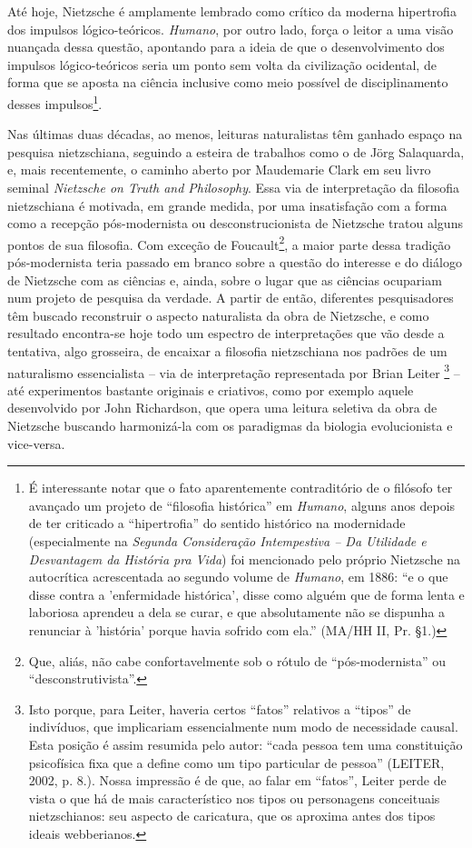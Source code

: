 \documentclass[
	12pt,				%
	openright,			%
	oneside,			%
	a4paper,			%
	english,			%
	french,				%
	spanish,			%
	brazil				%
	]{abntex2}
\newcommand{\Hum}{\textit{Humano}\xspace}
\begin{document}
	Até hoje, Nietzsche é amplamente lembrado como crítico da moderna hipertrofia dos impulsos lógico-teóricos. \Hum, por outro lado, força o leitor a uma visão nuançada dessa questão, apontando para a ideia de que o desenvolvimento dos impulsos lógico-teóricos seria um ponto sem volta da civilização ocidental, de forma que se aposta na ciência inclusive como meio possível de disciplinamento desses impulsos\footnote{É interessante notar que o fato aparentemente contraditório de o filósofo ter avançado um projeto de “filosofia histórica” em \textit{Humano}, alguns anos depois de ter criticado a “hipertrofia” do sentido histórico na modernidade (especialmente na \textit{Segunda Consideração Intempestiva – Da Utilidade e Desvantagem da História pra Vida}) foi mencionado pelo próprio Nietzsche na autocrítica acrescentada ao segundo volume de \textit{Humano}, em 1886: “e o que disse contra a 'enfermidade histórica', disse como alguém que de forma lenta e laboriosa aprendeu a dela se curar, e que absolutamente não se dispunha a renunciar à 'história' porque havia sofrido com ela.” (MA/HH II, Pr. §1.)}.

	Nas últimas duas décadas, ao menos, leituras naturalistas têm ganhado espaço na pesquisa nietzschiana, seguindo a esteira de trabalhos como o de Jörg Salaquarda, e, mais recentemente, o caminho aberto por Maudemarie Clark em seu livro seminal \textit{Nietzsche on Truth and Philosophy}. Essa via de interpretação da filosofia nietzschiana é motivada, em grande medida, por uma insatisfação com a forma como a recepção pós-modernista ou desconstrucionista de Nietzsche tratou alguns pontos de sua filosofia. Com exceção de Foucault\footnote{Que, aliás, não cabe confortavelmente sob o rótulo de “pós-modernista” ou “desconstrutivista”.}, a maior parte dessa tradição pós-modernista teria passado em branco sobre a questão do interesse e do diálogo de Nietzsche com as ciências e, ainda, sobre o lugar que as ciências ocupariam num projeto de pesquisa da verdade. A partir de então, diferentes pesquisadores têm buscado reconstruir o aspecto naturalista da obra de Nietzsche, e como resultado encontra-se hoje todo um espectro de interpretações que vão desde a tentativa, algo grosseira, de encaixar a filosofia nietzschiana nos padrões de um naturalismo essencialista – via de interpretação representada por Brian Leiter
\footnote{Isto porque, para Leiter, haveria certos “fatos” relativos a “tipos” de indivíduos, que implicariam essencialmente num modo de necessidade causal. Esta posição é assim resumida pelo autor: “cada pessoa tem uma constituição psicofísica fixa que a define como um tipo particular de pessoa” (LEITER, 2002, p. 8.). Nossa impressão é de que, ao falar em “fatos”, Leiter perde de vista o que há de mais característico nos tipos ou personagens conceituais nietzschianos: seu aspecto de caricatura, que os aproxima antes dos tipos ideais webberianos.} 
– até experimentos bastante originais e criativos, como por exemplo aquele desenvolvido por John Richardson, que opera uma  leitura seletiva da obra de Nietzsche buscando harmonizá-la com os paradigmas da biologia evolucionista e vice-versa. 
\end{document}
